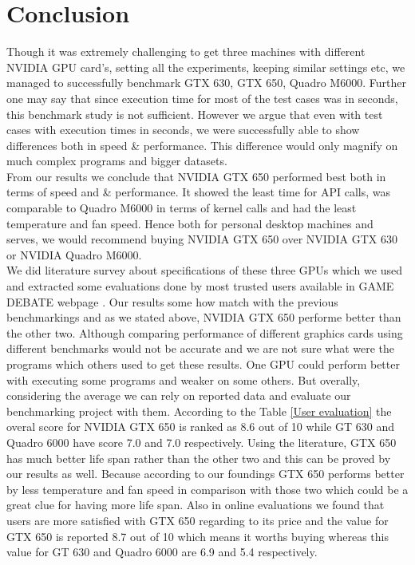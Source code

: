 \documentclass[paper=a4, fontsize=11pt]{scrartcl}
\numberwithin{equation}{section}		%
\numberwithin{figure}{section}			%
\numberwithin{table}{section}				%
\begin{document}
\newpage
\section{Conclusion}

Though it was extremely challenging to get three machines with different NVIDIA GPU card's, setting all the experiments, keeping similar settings etc, we managed to successfully benchmark GTX 630, GTX 650, Quadro M6000. Further one may say that since execution time for most of the test cases was in seconds, this benchmark study is not sufficient. However we argue that even with test cases with execution times in seconds, we were successfully able to show differences both in speed \& performance. This difference would only magnify on much complex programs and bigger datasets. \\

From our results we conclude that NVIDIA GTX 650 performed best both in terms of speed and \& performance. It showed the least time for API calls, was comparable to Quadro M6000 in terms of kernel calls and had the least temperature and fan speed. Hence both for personal desktop machines and serves, we would recommend buying NVIDIA GTX 650 over NVIDIA GTX 630 or NVIDIA Quadro M6000. \\

We did literature survey about specifications of these three GPUs which we used and extracted some evaluations done by most trusted users available in GAME DEBATE webpage \cite{game_debate}. Our results some how match with the previous benchmarkings and as we stated above, NVIDIA GTX 650 performe better than the other two. Although comparing performance of different graphics cards using different benchmarks would not be accurate and we are not sure what were the programs which others used to get these results. One GPU could perform better with executing some programs and weaker on some others. But overally, considering the average we can rely on reported data and evaluate our benchmarking project with them. According to the Table \ref{User evaluation} the overal score for NVIDIA GTX 650 is ranked as 8.6 out of 10 while GT 630 and Quadro 6000 have score 7.0 and 7.0 respectively. Using the literature, GTX 650 has much better life span rather than the other two and this can be proved by our results as well. Because according to our foundings GTX 650 performs better by less temperature and fan speed in comparison with those two which could be a great clue for having more life span. Also in online evaluations we found that users are more satisfied with GTX 650 regarding to its price and the value for GTX 650 is reported 8.7 out of 10 which means it worths buying whereas this value for GT 630 and Quadro 6000 are 6.9 and 5.4 respectively. \\
\end{document}

